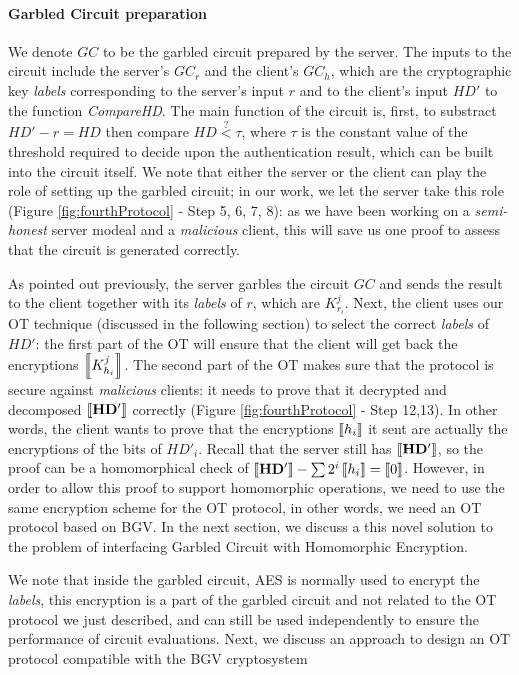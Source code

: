 \paragraph{Garbled Circuit preparation}
We denote \(GC\) to be the garbled circuit prepared by the server. The inputs to
the circuit include the server's \(GC_{r}\) and the client's \(GC_{h}\), which
are the cryptographic key \textit{labels} corresponding to the server's input
\(r\) and to the client's input \(HD'\) to the function \textit{CompareHD}. The main
function of the circuit is, first, to substract \(HD' - r = HD\) then compare
\(HD \stackrel{?}{<} \tau\), where \(\tau\) is the constant value of the
threshold required to decide upon the authentication result, which can be built into the
circuit itself. We note that either the server or the client can play the role of
setting up the garbled circuit; in our work, we let the server take this role
(Figure \ref{fig:fourthProtocol} - Step 5, 6, 7, 8): as we have
been working on a \textit{semi-honest} server modeal and a \textit{malicious }
client, this will save us one proof to assess that the circuit is generated
correctly.

As pointed out previously, the server garbles the circuit \(GC\) and sends the
result to the client together with its \textit{labels} of \(r\), which are
\(K_{r_{i}}^{j}\). Next, the client uses our OT technique (discussed in the
following section) to select the correct \textit{labels} of \(HD'\): the first
part of the OT will ensure that the client will get back the encryptions
\(\left\llbracket K_{h_{i}}^{j}\right\rrbracket\). The second part of the OT makes sure that the protocol
is secure against \textit{malicious} clients: it needs to prove that it
decrypted and decomposed \(\left\llbracket\mathbf{HD'}\right\rrbracket\) correctly (Figure
\ref{fig:fourthProtocol} - Step 12,13). In other words, the client wants to
prove that the encryptions \(\left\llbracket h_{i}\right\rrbracket\) it sent are actually the encryptions
of the bits of \(HD'_{i}\). Recall that the server still has
\(\left\llbracket\mathbf{HD'}\right\rrbracket\), so the proof can be a homomorphical check of
\(\left\llbracket\mathbf{HD'}\right\rrbracket - \sum{2^{i}\left\llbracket h_{i}\right\rrbracket} = \left\llbracket0\right\rrbracket\). However, in order to
allow this proof to support homomorphic operations, we need to use the same
encryption scheme for the OT protocol, in other words, we need an OT protocol
based on BGV. In the next section, we discuss a this novel solution to the problem of
interfacing Garbled Circuit with Homomorphic Encryption.

We note that inside the garbled circuit, AES is normally used to encrypt the
\textit{labels}, this encryption is a part of the garbled circuit and not
related to the OT protocol we just described, and can still be used independently
to ensure the performance of circuit evaluations. Next, we discuss an approach
to design an OT protocol compatible with the BGV cryptosystem


